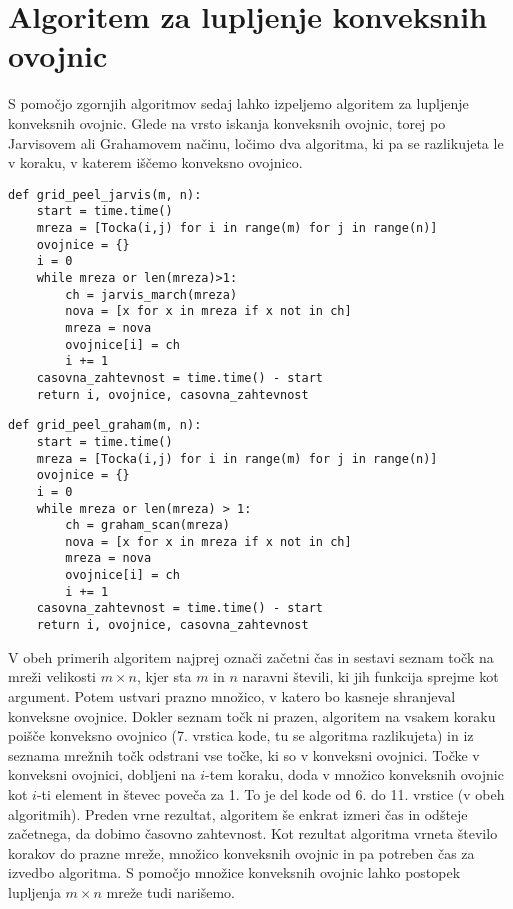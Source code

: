 \documentclass[a4paper]{article}
\begin{document}
\section{Algoritem za lupljenje konveksnih ovojnic}
S pomočjo zgornjih algoritmov sedaj lahko izpeljemo algoritem za lupljenje konveksnih ovojnic. Glede na vrsto iskanja konveksnih ovojnic, torej po Jarvisovem ali 
Grahamovem načinu, ločimo dva algoritma, ki pa se razlikujeta le v koraku, v katerem iščemo konveksno ovojnico.

\begin{lstlisting}
def grid_peel_jarvis(m, n):
    start = time.time()
    mreza = [Tocka(i,j) for i in range(m) for j in range(n)]
    ovojnice = {}
    i = 0
    while mreza or len(mreza)>1:
        ch = jarvis_march(mreza)
        nova = [x for x in mreza if x not in ch]
        mreza = nova
        ovojnice[i] = ch
        i += 1
    casovna_zahtevnost = time.time() - start
    return i, ovojnice, casovna_zahtevnost
\end{lstlisting}

\begin{lstlisting}
def grid_peel_graham(m, n):
    start = time.time()
    mreza = [Tocka(i,j) for i in range(m) for j in range(n)]
    ovojnice = {}
    i = 0
    while mreza or len(mreza) > 1:
        ch = graham_scan(mreza)
        nova = [x for x in mreza if x not in ch]
        mreza = nova
        ovojnice[i] = ch
        i += 1
    casovna_zahtevnost = time.time() - start 
    return i, ovojnice, casovna_zahtevnost
\end{lstlisting}

V obeh primerih algoritem najprej označi začetni čas in sestavi seznam točk na mreži velikosti $m \times n$, kjer sta $m$ in $n$ naravni števili, ki jih funkcija sprejme kot argument. Potem ustvari 
prazno množico, v katero bo kasneje shranjeval konveksne ovojnice. Dokler seznam točk ni prazen, algoritem na vsakem koraku poišče konveksno ovojnico (7. vrstica kode, tu se algoritma razlikujeta) 
in iz seznama mrežnih točk odstrani vse točke, ki so v konveksni ovojnici. Točke v konveksni ovojnici, dobljeni na $i$-tem koraku, doda v množico konveksnih ovojnic kot $i$-ti element in števec 
poveča za 1. To je del kode od 6. do 11. vrstice (v obeh algoritmih). Preden vrne rezultat, algoritem še enkrat izmeri čas in odšteje začetnega, da dobimo časovno zahtevnost. Kot rezultat algoritma 
vrneta število korakov do prazne mreže, množico konveksnih ovojnic in pa potreben čas za izvedbo algoritma. S pomočjo množice konveksnih ovojnic lahko postopek lupljenja $m \times n$ mreže tudi narišemo.
\end{document}
